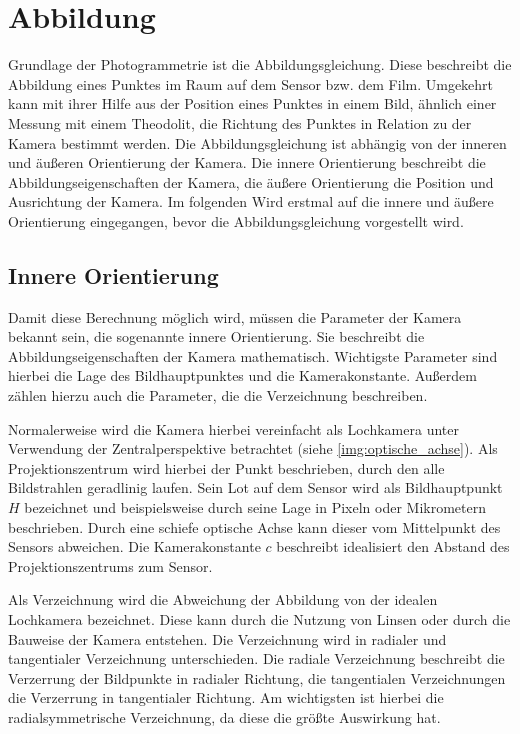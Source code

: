 \documentclass[./00PhotoBox.tex]{subfiles}
\begin{document}
\section{Abbildung}

Grundlage der Photogrammetrie ist die Abbildungsgleichung. Diese beschreibt die Abbildung eines Punktes im Raum auf dem Sensor bzw. dem Film. Umgekehrt kann mit ihrer Hilfe aus der Position eines Punktes in einem Bild, ähnlich einer Messung mit einem Theodolit, die Richtung des Punktes in Relation zu der Kamera bestimmt werden. Die Abbildungsgleichung ist abhängig von der inneren und äußeren Orientierung der Kamera. Die innere Orientierung beschreibt die Abbildungseigenschaften der Kamera, die äußere Orientierung die Position und Ausrichtung der Kamera. Im folgenden Wird erstmal auf die innere und äußere Orientierung eingegangen, bevor die Abbildungsgleichung vorgestellt wird.

\subsection{Innere Orientierung}
\label{s:innereorientierung}
Damit diese Berechnung möglich wird, müssen die Parameter der Kamera bekannt sein, die sogenannte innere Orientierung. Sie beschreibt die Abbildungseigenschaften der Kamera mathematisch. Wichtigste Parameter sind hierbei die Lage des Bildhauptpunktes und die Kamerakonstante. Außerdem zählen hierzu auch die Parameter, die die Verzeichnung beschreiben. \citep[S. 179f]{luhmann}

Normalerweise wird die Kamera hierbei vereinfacht als Lochkamera unter Verwendung der Zentralperspektive betrachtet (siehe \autoref{img:optische_achse}). Als Projektionszentrum wird hierbei der Punkt beschrieben, durch den alle Bildstrahlen geradlinig laufen. Sein Lot auf dem Sensor wird als Bildhauptpunkt $H$ bezeichnet und beispielsweise durch seine Lage in Pixeln oder Mikrometern beschrieben. Durch eine schiefe optische Achse kann dieser vom Mittelpunkt des Sensors abweichen. Die Kamerakonstante $c$ beschreibt idealisiert den Abstand des Projektionszentrums zum Sensor. \citep[S. 177]{luhmann}

Als Verzeichnung wird die Abweichung der Abbildung von der idealen Lochkamera bezeichnet. Diese kann durch die Nutzung von Linsen oder durch die Bauweise der Kamera entstehen. Die Verzeichnung wird in radialer und tangentialer Verzeichnung unterschieden. Die radiale Verzeichnung beschreibt die Verzerrung der Bildpunkte in radialer Richtung, die tangentialen Verzeichnungen die Verzerrung in tangentialer Richtung. Am wichtigsten ist hierbei die radialsymmetrische Verzeichnung, da diese die größte Auswirkung hat. \citep[S. 178]{luhmann}
\end{document}

